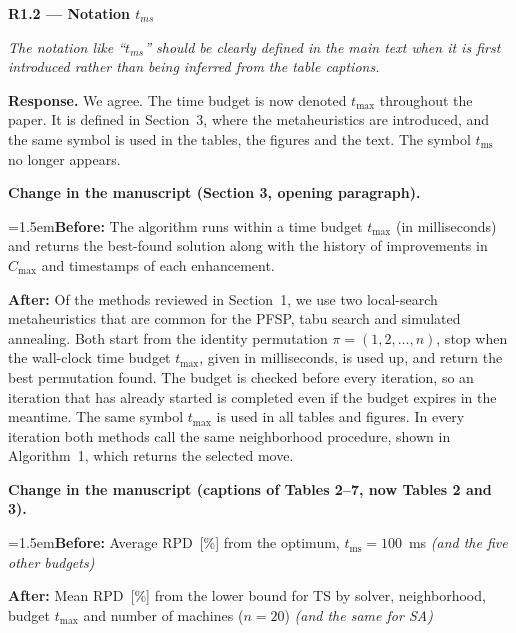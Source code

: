 \documentclass[12pt]{article}
\newenvironment{rc}[1]{\par\medskip\noindent\textbf{#1}\par\nopagebreak\noindent\itshape\renewcommand{\emph}[1]{\textbf{##1}}\ignorespaces}{\par}
\newcommand{\answer}[1]{\par\smallskip\noindent\textbf{Response.} #1\par}
\newcommand{\change}[3]{\par\smallskip\noindent\textbf{Change in the manuscript (#1).}\par
  {\leftskip=1.5em\noindent\textbf{Before:} #2\par\noindent\textbf{After:} #3\par}}
\begin{document}
\begin{rc}{R1.2 --- Notation $t_{ms}$}
The notation like ``$t_{ms}$'' should be clearly defined in the main text when it is first introduced rather than being inferred from the table captions.
\end{rc}
\answer{We agree. The time budget is now denoted $t_{\max}$ throughout the paper. It is defined in Section~3, where the metaheuristics are introduced, and the same symbol is used in the tables, the figures and the text. The symbol $t_{\mathrm{ms}}$ no longer appears.}
\change{Section 3, opening paragraph}{The algorithm runs within a time budget $t_{\max}$ (in milliseconds) and returns the best-found solution along with the history of improvements in $C_{\max}$ and timestamps of each enhancement.}{Of the methods reviewed in Section~1, we use two local-search metaheuristics that are common for the PFSP, tabu search and simulated annealing. Both start from the identity permutation $\pi=(1,2,\dots,n)$, stop when the wall-clock time budget $t_{\max}$, given in milliseconds, is used up, and return the best permutation found. The budget is checked before every iteration, so an iteration that has already started is completed even if the budget expires in the meantime. The same symbol $t_{\max}$ is used in all tables and figures. In every iteration both methods call the same neighborhood procedure, shown in Algorithm~1, which returns the selected move.}
\change{captions of Tables 2--7, now Tables 2 and 3}{Average RPD~[\%] from the optimum, $t_{\mathrm{ms}}=100$~ms \textit{(and the five other budgets)}}{Mean RPD~[\%] from the lower bound for TS by solver, neighborhood, budget $t_{\max}$ and number of machines ($n=20$) \textit{(and the same for SA)}}
\end{document}
